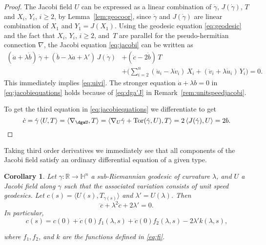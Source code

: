 \documentclass[10pt]{amsart}
\newtheorem{corollary}[theorem]{Corollary}
\theoremstyle{definition}
\theoremstyle{remark}
\numberwithin{equation}{section}
\begin{document}
\begin{proof}
The Jacobi field $U$ can be expressed as a linear combination of ${\dot{\gamma}}$, $J({\dot{\gamma}})$, $T$ and $X_i$, $Y_i$, $i{\geqslant} 2$, by Lemma~\ref{lem:geocoor}, since ${\dot{\gamma}}$ and $J({\dot{\gamma}})$ are linear combination of $X_1$ and $Y_1=J(X_1)$. Using the geodesic equation \eqref{eq:geodesic} and the fact that $X_{i}$, $Y_{i}$, $i{\geqslant} 2$, and~$T$ are parallel for the pseudo-hermitian connection $\nabla$, the Jacobi equation \eqref{eq:jacobi} can be written as
\begin{align*}
(\ddot{a}+{\lambda}\dot{b})\,{\dot{\gamma}}+(\ddot{b}-{\lambda}\dot{a}+{\lambda}')\,J({\dot{\gamma}})&+(\ddot{c}-2\dot{b})\,T
\\
&+\bigg(\sum_{i=2}^n (\ddot{u}_{i}-{\lambda} \dot{v}_i)\,X_{i}+(\ddot{v}_{i}+{\lambda}\dot{u}_i)\,Y_{i}\bigg)
=0.
\end{align*}
This immediately implies \eqref{eq:uivi}. The stronger equation $\dot{a}+{\lambda} b=0$ in \eqref{eq:jacobiequations} holds because of \eqref{eq:dga'J} in Remark~\ref{rem:unitspeedjacobi}.

To get the third equation in \eqref{eq:jacobiequations} we differentiate to get
\[
\dot{c}={\dot{\gamma}}\,{\langle{U,T}\rangle}={\langle{\nabla_\dgaU,T}\rangle}={\langle{\nabla_U{\dot{\gamma}}+\operatorname{Tor}({\dot{\gamma}},U),T}\rangle}=2\,{\langle{J({\dot{\gamma}}),U}\rangle}=2b.\qedhere
\]

\end{proof}

Taking third order derivatives we immediately see that all components of the Jacobi field satisfy an ordinary differential equation of a given type.

\begin{corollary}
\label{cor:jacobiequations-1}
Let ${\gamma}:{{\mathbb{R}}}\to{{\mathbb{H}}}^n$ a sub-Riemannian geodesic of curvature ${\lambda}$, and $U$ a Jacobi field along ${\gamma}$ such that the associated variation consists of unit speed geodesics. Let $c(s)={\langle{U(s),T_{{\gamma}(s)}}\rangle}$ and ${\lambda}'=U({\lambda})$. Then
\begin{equation}
\label{eq:odec}
\dddot{c}+{\lambda}^2\dot{c}+2{\lambda}'=0.
\end{equation}
In particular,
\begin{equation}
\label{eq:expc}
c(s)=c(0)+\dot{c}(0)f_1({\lambda}, s)+\ddot{c}(0)f_2({\lambda}, s)-2{\lambda}'k({\lambda}, s),
\end{equation}

where $f_1,f_2$, and $k$ are the functions defined in \eqref{eq:fi}.

\end{corollary}
\end{document}
